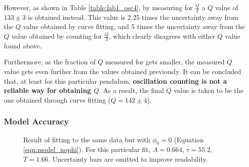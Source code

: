 \documentclass[aps,twocolumn,secnumarabic,nobalancelastpage,amsmath,amssymb,nofootinbib,floatfix,letterpaper]{revtex4}
\begin{document}
However, as shown in Table \ref{table:lab1_osc4}, by measuring for \(\frac{Q}{4}\) a \(Q\) value of \(133 \pm 3\) is
obtained instead. This value is 2.25 times the uncertainty away from the \(Q\) value obtained by curve fitting, and 5
times the uncertainty away from the \(Q\) value obtained by counting for \(\frac{Q}{3}\), which clearly disagrees with
either \(Q\) value found above.

Furthermore, as the fraction of \(Q\) measured for gets smaller, the measured \(Q\) value gets even further from the
values obtained previously. It can be concluded that, at least for this particular pendulum, \textbf{oscillation
counting is not a reliable way for obtaining \(Q\)}. As a result, the final \(Q\) value is taken to be the one obtained
through curve fitting (\(Q = 142 \pm 4\)).

\subsubsection{Model Accuracy}

\begin{figure*}[t]
    \caption{Result of fitting to the same data but with \(\phi_0 = 0\) (Equation \ref{eqn:model_nophi}). For this
        particular fit, \(A = 0.664\), \(\tau = 55.2\), \(T = 1.66\). Uncertainty bars are omitted to improve readability.}
    \label{fig:lab1_fit2}
\end{figure*}
\end{document}
